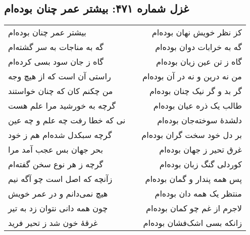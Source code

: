 \begin{center}
\section*{غزل شماره ۴۷۱: بیشتر عمر چنان بوده‌ام}
\label{sec:471}
\begin{longtable}{l p{0.5cm} r}
بیشتر عمر چنان بوده‌ام
&&
کز نظر خویش نهان بوده‌ام
\\
گه به مناجات به سر گشته‌ام
&&
گه به خرابات دوان بوده‌ام
\\
گاه ز جان سود بسی کرده‌ام
&&
گاه ز تن عین زیان بوده‌ام
\\
راستی آن است که از هیچ وجه
&&
من نه درین و نه در آن بوده‌ام
\\
من چکنم کان که چنان خواستند
&&
گر بد و گر نیک چنان بوده‌ام
\\
گرچه به خورشید مرا علم هست
&&
طالب یک ذره عیان بوده‌ام
\\
نی که خطا رفت چه علم و چه عین
&&
دلشدهٔ سوخته‌جان بوده‌ام
\\
گرچه سبکدل شده‌ام هم ز خود
&&
بر دل خود سخت گران بوده‌ام
\\
بحر جهان بس عجب آمد مرا
&&
غرق تحیر ز جهان بوده‌ام
\\
گرچه ز هر نوع سخن گفته‌ام
&&
کوردلی گنگ زبان بوده‌ام
\\
زآنچه که اصل است چو آگه نیم
&&
پس همه پندار و گمان بوده‌ام
\\
هیچ نمی‌دانم و در عمر خویش
&&
منتظر یک همه دان بوده‌ام
\\
چون همه دانی نتوان زد به تیر
&&
لاجرم از غم چو کمان بوده‌ام
\\
غرقهٔ خون شد ز تحیر فرید
&&
زانکه بسی اشک‌فشان بوده‌ام
\\
\end{longtable}
\end{center}
